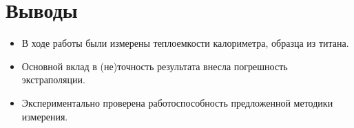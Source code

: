 \documentclass[a4paper, 12pt]{article}
\begin{document}
\bigskip

\section*{Выводы}

\begin{itemize}
	\item В ходе работы были измерены теплоемкости калориметра, образца из титана.
	
	\item Основной вклад в (не)точность результата внесла погрешность экстраполяции.
	
	\item Экспериментально проверена работоспособность предложенной методики измерения.
\end{itemize}
\end{document}
